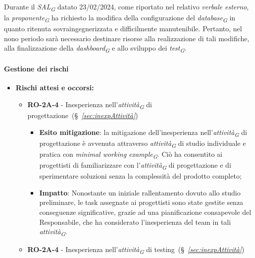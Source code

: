 Durante il \textit{SAL}\textsubscript{\textit{G}} datato 23/02/2024, come riportato nel relativo \textit{verbale esterno}, la \textit{proponente}\textsubscript{\textit{G}} ha richiesto la modifica della configurazione del \textit{database}\textsubscript{\textit{G}} in quanto ritenuta sovraingegnerizzata e difficilmente manutenibile. Pertanto, nel nono periodo sarà necessario destinare risorse alla realizzazione di tali modifiche, alla finalizzazione della \textit{dashboard}\textsubscript{\textit{G}} e allo sviluppo dei \textit{test}\textsubscript{\textit{G}}.

\paragraph{Gestione dei rischi} 

\begin{itemize}
    \item \textbf{Rischi attesi e occorsi:}
\begin{itemize}
    \item \textbf{RO-2A-4} - Inesperienza nell'\textit{attività}\textsubscript{\textit{G}} di progettazione~(\S~\textit{\ref{sec:inexpAttività}})
        \begin{itemize}
            \item \textbf{Esito mitigazione}: 
            la mitigazione dell'inesperienza nell'\textit{attività}\textsubscript{\textit{G}} di progettazione è avvenuta attraverso \textit{attività}\textsubscript{\textit{G}} di studio individuale e pratica con \textit{minimal working example}\textsubscript{\textit{G}}. Ciò ha consentito ai progettisti di familiarizzare con l'\textit{attività}\textsubscript{\textit{G}} di progettazione e di sperimentare soluzioni senza la complessità del prodotto completo;
            \item \textbf{Impatto}: Nonostante un iniziale rallentamento dovuto allo studio preliminare, le task assegnate ai progettisti sono state gestite senza conseguenze significative, grazie ad una pianificazione consapevole del Responsabile, che ha considerato l'inesperienza del team in tali \textit{attività}\textsubscript{\textit{G}}.
        \end{itemize}
    \item \textbf{RO-2A-4} - Inesperienza nell'\textit{attività}\textsubscript{\textit{G}} di testing~(\S~\textit{\ref{sec:inexpAttività}})
        \begin{itemize}

\end{itemize}
\end{itemize}
\end{itemize}
